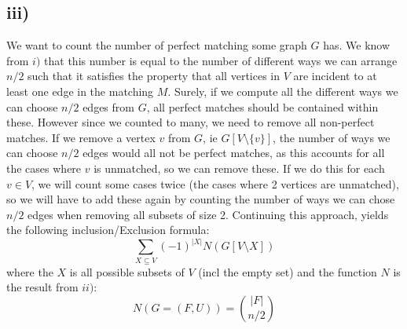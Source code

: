 \documentclass[a4paper]{article}
\begin{document}
\subsection*{iii)}
We want to count the number of perfect matching some graph $G$ has. We know from $i)$ that this number is equal to the number of different ways we can arrange $n/2$ such that it satisfies the property that all vertices in $V$ are incident to at least one edge in the matching $M$. Surely, if we compute all the different ways we can choose $n/2$ edges from $G$, all perfect matches should be contained within these. However since we counted to many, we need to remove all non-perfect matches. If
we remove a vertex $v$ from $G$, ie $G[V\setminus \{v\}]$, the number of ways we can choose $n/2$ edges would all not be perfect matches, as this accounts for all the cases where $v$ is unmatched, so we can remove these. If we do this for each $v\in V$, we will count some cases twice (the cases where 2 vertices are unmatched), so we will have to add these again by counting the number of ways we can chose $n/2$ edges when removing all subsets of size 2. Continuing this approach, yields the
following inclusion/Exclusion formula:
$$
\sum_{X\subseteq V} (-1)^{|X|} N(G[V \setminus X])
$$
where the $X$ is all possible subsets of $V$ (incl the empty set) and the function $N$ is the result from $ii)$:
$$
N(G=(F,U)) = \binom{|F|}{n/2}
$$
\end{document}
